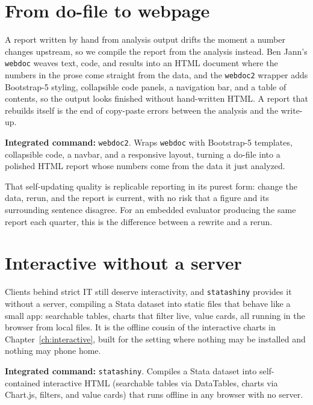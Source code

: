 \documentclass[
    a4paper,
    fontsize=10pt,
    twoside=true,
    numbers=noenddot,
]{kaobook}
\begin{document}
\section{From do-file to webpage}
A report written by hand from analysis output drifts the moment a number changes upstream, so we compile the report from the analysis instead. Ben Jann's \texttt{webdoc} weaves text, code, and results into an HTML document where the numbers in the prose come straight from the data, and the \texttt{webdoc2} wrapper adds Bootstrap-5 styling, collapsible code panels, a navigation bar, and a table of contents, so the output looks finished without hand-written HTML. A report that rebuilds itself is the end of copy-paste errors between the analysis and the write-up.

\begin{kaobox}[frametitle=Package Integration: \texttt{webdoc2}]
\textbf{Integrated command:} \texttt{webdoc2}. Wraps \texttt{webdoc} with Bootstrap-5 templates, collapsible code, a navbar, and a responsive layout, turning a do-file into a polished HTML report whose numbers come from the data it just analyzed.
\end{kaobox}

That self-updating quality is replicable reporting in its purest form: change the data, rerun, and the report is current, with no risk that a figure and its surrounding sentence disagree. For an embedded evaluator producing the same report each quarter, this is the difference between a rewrite and a rerun.

\section{Interactive without a server}
Clients behind strict IT still deserve interactivity, and \texttt{statashiny} provides it without a server, compiling a Stata dataset into static files that behave like a small app: searchable tables, charts that filter live, value cards, all running in the browser from local files. It is the offline cousin of the interactive charts in Chapter~\ref{ch:interactive}, built for the setting where nothing may be installed and nothing may phone home.

\begin{kaobox}[frametitle=Package Integration: \texttt{statashiny}]
\textbf{Integrated command:} \texttt{statashiny}. Compiles a Stata dataset into self-contained interactive HTML (searchable tables via DataTables, charts via Chart.js, filters, and value cards) that runs offline in any browser with no server.
\end{kaobox}
\end{document}
